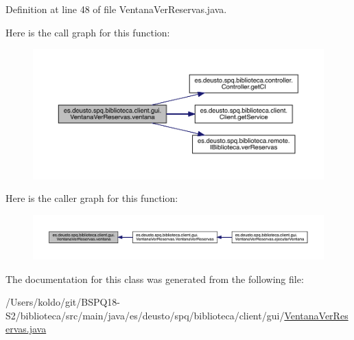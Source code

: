 Definition at line 48 of file Ventana\+Ver\+Reservas.\+java.

Here is the call graph for this function\+:
\nopagebreak
\begin{figure}[H]
\begin{center}
\leavevmode
\includegraphics[width=350pt]{classes_1_1deusto_1_1spq_1_1biblioteca_1_1client_1_1gui_1_1_ventana_ver_reservas_acb37e5558041a4fa7de51af1417a059f_cgraph}
\end{center}
\end{figure}
Here is the caller graph for this function\+:
\nopagebreak
\begin{figure}[H]
\begin{center}
\leavevmode
\includegraphics[width=350pt]{classes_1_1deusto_1_1spq_1_1biblioteca_1_1client_1_1gui_1_1_ventana_ver_reservas_acb37e5558041a4fa7de51af1417a059f_icgraph}
\end{center}
\end{figure}


The documentation for this class was generated from the following file\+:\begin{DoxyCompactItemize}
\item 
/\+Users/koldo/git/\+B\+S\+P\+Q18-\/\+S2/biblioteca/src/main/java/es/deusto/spq/biblioteca/client/gui/\mbox{\hyperlink{_ventana_ver_reservas_8java}{Ventana\+Ver\+Reservas.\+java}}\end{DoxyCompactItemize}
